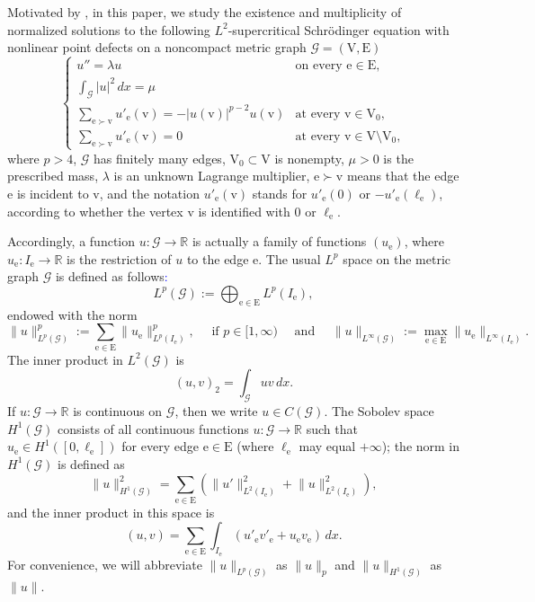 \documentclass[11pt]{amsart}
\newcommand{\abs}[1]{\lvert#1\rvert}
\newcommand{\norm}[1]{\lVert#1\rVert}
\newcommand{\blue}[1]{\textcolor{blue}{#1}}
\newcommand{\G}{\mathcal{G}}
\newcommand{\E}{\mathrm{E}}
\newcommand{\V}{\mathrm{V}}
\newcommand{\e}{\mathrm{e}}
\newcommand{\vv}{\mathrm{v}}
\numberwithin{equation}{section}
\begin{document}
Motivated by \cite{BDS,Bort,Ca}, in this paper, we study the existence and multiplicity of normalized solutions to the following $L^2$-supercritical Schr\"odinger equation with nonlinear point defects on a noncompact metric graph $\G=(\V,\E)$ 
\begin{equation}\label{eqpd}
        \begin{cases} 
u'' = \lambda u & \text{on every } \e \in \E, \\ 
\int_\G \abs{u}^2\, dx = \mu & \\
\displaystyle \sum_{\e \succ \vv}  u'_\e(\vv) = -|u(\vv)|^{p-2}u(\vv) & \text{at every } \vv \in \V_0, \\ 
\displaystyle \sum_{\e \succ \vv}  u'_\e(\vv) = 0 & \text{at every } \vv \in \V \setminus \V_0,
\end{cases}
\end{equation}
where $p>4$, $\G$ has finitely many edges, $\V_0 \subset \V$ is nonempty, $\mu>0$ is the prescribed mass, $\lambda$ is an unknown Lagrange multiplier, $\e \succ \vv$ means that the edge $\e$ is incident to $\vv$, and the notation $u'_\e(\vv)$ stands for $u'_\e(0)$ or $-u'_\e(\ell_\e)$, according to whether the vertex $\vv$ is identified with $0$ or $\ell_\e$. 

Accordingly, a function $u: \G \to \mathbb{R}$ is actually a family of functions $(u_\e)$, where $u_\e: I_\e \to \mathbb{R}$ is the restriction of $u$ to the edge $\e$. The usual $L^p$ space on the metric graph  $\G$ is defined as follows\blue{:}
$$
L^p(\mathcal{G}):=\bigoplus_{\e \in \mathrm{E}} L^p(I_\e),
$$
endowed with the norm
$$
\norm{u}_{L^p(\G)}^p := \sum_{\e \in \mathrm{E}}\norm{u_\e}_{L^p(I_\e)}^p, \quad \text { if } p \in[1, \infty) \quad \text { and } \quad \norm{u}_{L^{\infty}(\G)}:=\max_{\e \in \mathrm{E}}\norm{u_\e}_{L^{\infty}(I_\e)}.
$$
The inner product in $L^2(\mathcal{G})$ is
\begin{equation*}
(u,v)_2= \int_\G uv\,dx.
\end{equation*}
If $u:\G \to\mathbb{R}$ is continuous on $\G$, then we write $u \in C(\G)$. The Sobolev space $H^1(\G)$ consists of all continuous functions $u : \G \to \mathbb{R}$ such that $u_\e \in  H^1([0,\ell_\e])$ for every edge $\e\in \E$ (where $\ell_\e$ may equal $+\infty$); the norm in $H^1(\G)$ is defined as
\begin{equation*}
    \norm{u}^2_{H^1(\G)} = \underset{\e \in \E}\sum \left(\norm{u'}^2_{L^2(I_\e)}+\norm{u}^2_{L^2(I_\e)}\right),
\end{equation*}
and the inner product in this space is
\begin{equation*}
(u,v)= \underset{\e \in \E}\sum \int_{I_\e} \left(u'_{\e}v'_{\e}+  u_{\e}v_{\e}\right)\,dx.
\end{equation*}
For convenience, we will abbreviate $\norm{u}_{L^p(\G)}$ as $\norm{u}_p$ and $\norm{u}_{H^1(\G)}$ as $\norm{u}$. 
\end{document}
